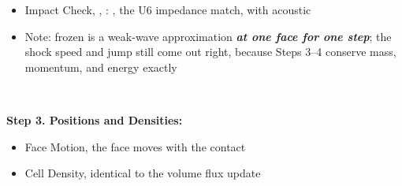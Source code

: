 \documentclass[11pt,addpoints]{exam}
\begin{document}
\begin{tcolorbox}[breakable]
\begin{itemize}
\item Impact Check, \hspace{3mm} , \hspace{2mm} : \hspace{2mm} , \hspace{2mm}  \hspace{7mm} the U6 impedance match, with acoustic \vspace{.5em}
\item Note: frozen  is a weak-wave approximation \textbf{\emph{at one face for one step}}; the shock speed and jump still come out right, because Steps 3--4 conserve mass, momentum, and energy exactly
\end{itemize}
\end{tcolorbox}

\;\\

\begin{tcolorbox}[breakable]
\textbf{Step 3. Positions and Densities:}\vspace{.5em}
\begin{itemize}
\item Face Motion, \hspace{3mm}  \hspace{7mm} the face moves with the contact\vspace{.5em}
\item Cell Density, \hspace{3mm}  \hspace{7mm} identical to the volume flux update \hspace{2mm} 
\end{itemize}
\end{tcolorbox}

\;\\
\end{document}
